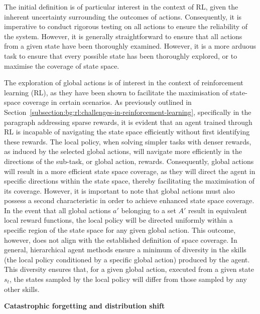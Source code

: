 The initial definition is of particular interest in the context of RL, given the inherent uncertainty surrounding the
outcomes of actions.
Consequently, it is imperative to conduct rigorous testing on all actions to ensure the reliability of the system.
However, it is generally straightforward to ensure that all actions from a given state have been thoroughly examined.
However, it is a more arduous task to ensure that every possible state has been thoroughly explored, or to maximise the
coverage of state space.

The exploration of global actions is of interest in the context of reinforcement learning (RL), as they have been shown
to facilitate the maximisation of state-space coverage in certain scenarios.
As previously outlined in Section~\ref{subsection:bg:rl:challenges-in-reinforcement-learning}, specifically in the
paragraph addressing sparse rewards, it is evident that an agent trained through RL is incapable of navigating the
state space efficiently without first identifying these rewards.
The local policy, when solving simpler tasks with denser rewards, as induced by the selected global actions, will
navigate more efficiently in the directions of the sub-task, or global action, rewards.
Consequently, global actions will result in a more efficient state space coverage, as they will direct the agent in
specific directions within the state space, thereby facilitating the maximisation of its coverage.
However, it is important to note that global actions must also possess a second characteristic in order to achieve
enhanced state space coverage.
In the event that all global actions $a'$ belonging to a set $A'$ result in equivalent local reward functions, the
local policy will be directed uniformly within a specific region of the state space for any given global action.
This outcome, however, does not align with the established definition of space coverage.
In general, hierarchical agent methods ensure a minimum of diversity in the skills (the local policy conditioned by a
specific global action) produced by the agent.
This diversity ensures that, for a given global action, executed from a given state $s_t$, the states sampled by the
local policy will differ from those sampled by any other skills.

\textbf{Catastrophic forgetting and distribution shift}

